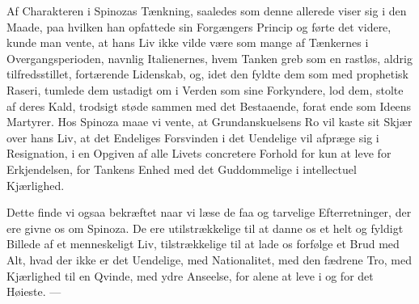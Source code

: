 \documentclass[12pt,a4paper]{book}
\begin{document}
Af Charakteren i Spinozas Tænkning, saaledes som denne allerede viser sig
i den Maade, paa hvilken han opfattede sin Forgængers Princip og førte det
videre, kunde man vente, at hans Liv ikke vilde være som mange af
Tænkernes i Overgangsperioden, navnlig Italienernes, hvem Tanken greb som
en rastløs, aldrig tilfredsstillet, fortærende Lidenskab, og, idet den
fyldte dem som med prophetisk Raseri, tumlede dem ustadigt om i Verden som
sine Forkyndere, lod dem, stolte af deres Kald, trodsigt støde sammen med
det Bestaaende, forat ende som Ideens Martyrer. Hos Spinoza maae vi vente,
at Grundanskuelsens Ro vil kaste sit Skjær over hans Liv, at det Endeliges
Forsvinden i det Uendelige vil afpræge sig i Resignation, i en Opgiven af
alle Livets concretere Forhold for kun at leve for Erkjendelsen, for
Tankens Enhed med det Guddommelige i intellectuel Kjærlighed.

Dette finde vi ogsaa bekræftet naar vi læse de faa og tarvelige
Efterretninger, der ere givne os om Spinoza. De ere utilstrækkelige til at
danne os et helt og fyldigt Billede af et menneskeligt Liv, tilstrækkelige
til at lade os forfølge et Brud med Alt, hvad der ikke er det Uendelige,
med Nationalitet, med den fædrene Tro, med Kjærlighed til en Qvinde, med
ydre Anseelse, for alene at leve i og for det Høieste. ---
\end{document}
